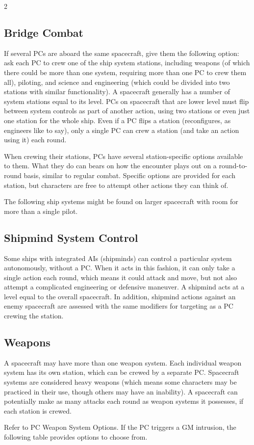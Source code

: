 \begin{multicols}{2}
\subsection{Bridge Combat}

If several PCs are aboard the same spacecraft, give them the following option: ask each PC to crew one of the ship system stations, including weapons (of which there could be more than one system, requiring more than one PC to crew them all), piloting, and science and engineering (which could be divided into two stations with similar functionality). A spacecraft generally has a number of system stations equal to its level. PCs on spacecraft that are lower level must flip between system controls as part of another action, using two stations or even just one station for the whole ship. Even if a PC flips a station (reconfigures, as engineers like to say), only a single PC can crew a station (and take an action using it) each round.

When crewing their stations, PCs have several station-specific options available to them. What they do can bears on how the encounter plays out on a round-to-round basis, similar to regular combat. Specific options are provided for each station, but characters are free to attempt other actions they can think of.

The following ship systems might be found on larger spacecraft with room for more than a single pilot.

\subsection{Shipmind System Control}

Some ships with integrated AIs (shipminds) can control a particular system autonomously, without a PC. When it acts in this fashion, it can only take a single action each round, which means it could attack and move, but not also attempt a complicated engineering or defensive maneuver. A shipmind acts at a level equal to the overall spacecraft. In addition, shipmind actions against an enemy spacecraft are assessed with the same modifiers for targeting as a PC crewing the station.

\subsection{Weapons}

A spacecraft may have more than one weapon system. Each individual weapon system has its own station, which can be crewed by a separate PC. Spacecraft systems are considered heavy weapons (which means some characters may be practiced in their use, though others may have an inability). A spacecraft can potentially make as many attacks each round as weapon systems it possesses, if each station is crewed. 

Refer to PC Weapon System Options. If the PC triggers a GM intrusion, the following table provides options to choose from.

\end{multicols}

